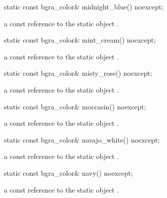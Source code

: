\begin{itemdecl}
static const bgra_color& midnight_blue() noexcept;
\end{itemdecl}
\begin{itemdescr}
\pnum
\returns
a const reference to the static  object .
\end{itemdescr}

\begin{itemdecl}
static const bgra_color& mint_cream() noexcept;
\end{itemdecl}
\begin{itemdescr}
\pnum
\returns
a const reference to the static  object .
\end{itemdescr}

\begin{itemdecl}
static const bgra_color& misty_rose() noexcept;
\end{itemdecl}
\begin{itemdescr}
\pnum
\returns
a const reference to the static  object .
\end{itemdescr}

\begin{itemdecl}
static const bgra_color& moccasin() noexcept;
\end{itemdecl}
\begin{itemdescr}
\pnum
\returns
a const reference to the static  object .
\end{itemdescr}

\begin{itemdecl}
static const bgra_color& navajo_white() noexcept;
\end{itemdecl}
\begin{itemdescr}
\pnum
\returns
a const reference to the static  object .
\end{itemdescr}

\begin{itemdecl}
static const bgra_color& navy() noexcept;
\end{itemdecl}
\begin{itemdescr}
\pnum
\returns
a const reference to the static  object .
\end{itemdescr}

